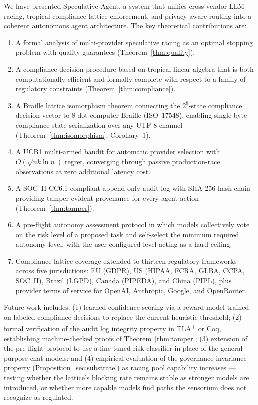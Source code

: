 \documentclass[11pt,twocolumn]{article}
\begin{document}
We have presented Speculative Agent, a system that unifies cross-vendor LLM racing,
tropical compliance lattice enforcement, and privacy-aware routing into a coherent
autonomous agent architecture. The key theoretical contributions are:

\begin{enumerate}
  \item A formal analysis of multi-provider speculative racing as an optimal stopping
  problem with quality guarantees (Theorem~\ref{thm:quality}).

  \item A compliance decision procedure based on tropical linear algebra that is
  both computationally efficient and formally complete with respect to a family of
  regulatory constraints (Theorem~\ref{thm:compliance}).

  \item A Braille lattice isomorphism theorem connecting the $2^8$-state compliance
  decision vector to 8-dot computer Braille (ISO~17548), enabling single-byte
  compliance state serialization over any UTF-8 channel
  (Theorem~\ref{thm:isomorphism}, Corollary~1).

  \item A UCB1 multi-armed bandit for automatic provider selection with
  $O(\sqrt{nk \ln n})$ regret, converging through passive production-race
  observations at zero additional latency cost.

  \item A SOC~II CC6.1 compliant append-only audit log with SHA-256 hash chain
  providing tamper-evident provenance for every agent action
  (Theorem~\ref{thm:tamper}).

  \item A pre-flight autonomy assessment protocol in which models collectively
  vote on the risk level of a proposed task and self-select the minimum required
  autonomy level, with the user-configured level acting as a hard ceiling.

  \item Compliance lattice coverage extended to thirteen regulatory frameworks
  across five jurisdictions: EU (GDPR), US (HIPAA, FCRA, GLBA, CCPA, SOC~II),
  Brazil (LGPD), Canada (PIPEDA), and China (PIPL), plus provider terms of
  service for OpenAI, Anthropic, Google, and OpenRouter.
\end{enumerate}

Future work includes: (1) learned confidence scoring via a reward model trained
on labeled compliance decisions to replace the current heuristic threshold;
(2) formal verification of the audit log integrity property in TLA\textsuperscript{+}
or Coq, establishing machine-checked proofs of Theorem~\ref{thm:tamper};
(3) extension of the pre-flight protocol to use a fine-tuned risk
classifier in place of the general-purpose chat models;
and (4) empirical evaluation of the governance invariance property
(Proposition~\ref{sec:substrate}) as racing pool capability increases —
testing whether the lattice's blocking rate remains stable as stronger
models are introduced, or whether more capable models find paths the
sensorium does not recognize as regulated.



\end{document}
